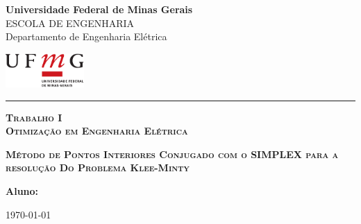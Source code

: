 \thispagestyle{empty}

\noindent
\begin{minipage}{0.8\linewidth}
  {\Large\bf Universidade Federal de Minas Gerais}\\
  {\small ESCOLA DE ENGENHARIA}\\
  {\sc Departamento de Engenharia Elétrica}
\end{minipage} 
\hfill 
\begin{minipage}{3cm}
  \includegraphics[width=3cm]{ufmg_ext.pdf}
\end{minipage}

\vspace{1mm}

\noindent
\hrule

\vspace{2.0cm}

\vfill

\begin{center}
  \Large \textsc{\textbf{Trabalho I}}\\ 
  \Large \textsc{\textbf{Otimização em Engenharia Elétrica}}
\end{center}

\vfill

\begin{center}
  \Large\textsc{\textbf{Método de Pontos Interiores Conjugado com o SIMPLEX para a resolução Do Problema Klee-Minty}}
\end{center}

\vfill

\begin{flushright}
\begin{minipage}{12.0cm}
{\bf Aluno:} \nomeAluno \\
\end{minipage}
\end{flushright}

\vfill

\begin{center}
  \today
\end{center}

\vfill

\newpage
